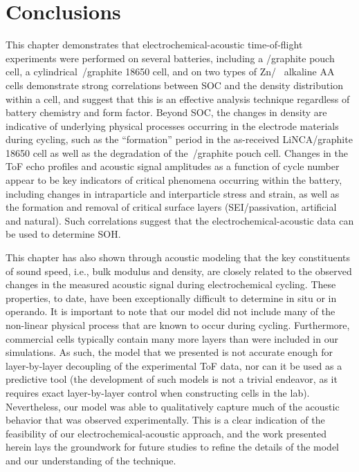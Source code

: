 \section{Conclusions}
\label{sec:bw:conclusion}

This chapter demonstrates that electrochemical-acoustic time-of-flight experiments were performed on several batteries, including a /graphite pouch cell, a cylindrical~/graphite 18650 cell, and on two types of Zn/~ alkaline AA cells demonstrate strong correlations between SOC and the density distribution within a cell, and suggest that this is an effective analysis technique regardless of battery chemistry and form factor. Beyond SOC, the changes in density are indicative of underlying physical processes occurring in the electrode materials during cycling, such as the “formation” period in the as-received LiNCA/graphite 18650 cell as well as the degradation of the~/graphite pouch cell. Changes in the ToF echo profiles and acoustic signal amplitudes as a function of cycle number appear to be key indicators of critical phenomena occurring within the battery, including changes in intraparticle and interparticle stress and strain, as well as the formation and removal of critical surface layers (SEI/passivation, artificial and natural). Such correlations suggest that the electrochemical-acoustic data can be used to determine SOH.
	
This chapter has also shown through acoustic modeling that the key constituents of sound speed, i.e., bulk modulus and density, are closely related to the observed changes in the measured acoustic signal during electrochemical cycling. These properties, to date, have been exceptionally difficult to determine in situ or in operando. It is important to note that our model did not include many of the non-linear physical process that are known to occur during cycling. Furthermore, commercial cells typically contain many more layers than were included in our simulations. As such, the model that we presented is not accurate enough for layer-by-layer decoupling of the experimental ToF data, nor can it be used as a predictive tool (the development of such models is not a trivial endeavor, as it requires exact layer-by-layer control when constructing cells in the lab). Nevertheless, our model was able to qualitatively capture much of the acoustic behavior that was observed experimentally. This is a clear indication of the feasibility of our electrochemical-acoustic approach, and the work presented herein lays the groundwork for future studies to refine the details of the model and our understanding of the technique.

